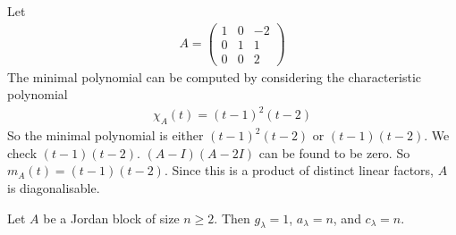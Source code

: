 \begin{example}
	Let
	\begin{align*}
		A = \begin{pmatrix}
			1 & 0 & -2 \\
			0 & 1 & 1  \\
			0 & 0 & 2
		\end{pmatrix}
	\end{align*}
	The minimal polynomial can be computed by considering the characteristic polynomial
	\begin{align*}
		\chi_A(t) = (t-1)^2(t-2)
	\end{align*}
	So the minimal polynomial is either $(t-1)^2(t-2)$ or $(t-1)(t-2)$.
	We check $(t-1)(t-2)$.
	$(A - I)(A - 2I)$ can be found to be zero.
	So $m_A(t) = (t-1)(t-2)$.
	Since this is a product of distinct linear factors, $A$ is diagonalisable.
\end{example}
\begin{example}
	Let $A$ be a Jordan block of size $n \geq 2$.
	Then $g_\lambda = 1$, $a_\lambda = n$, and $c_\lambda = n$.
\end{example}

